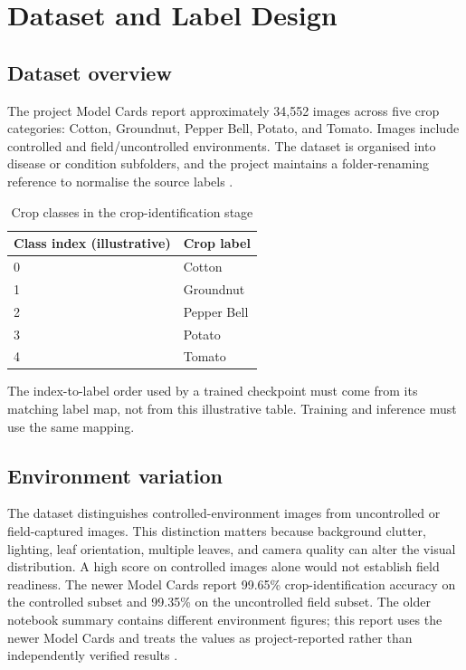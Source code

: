 \documentclass[12pt,a4paper,oneside,openany]{report}
\begin{document}
\chapter{Dataset and Label Design}
\section{Dataset overview}
The project Model Cards report approximately 34,552 images across five crop categories: Cotton, Groundnut, Pepper Bell, Potato, and Tomato. Images include controlled and field/uncontrolled environments. The dataset is organised into disease or condition subfolders, and the project maintains a folder-renaming reference to normalise the source labels \cite{dataset_doc,model_cards}.

\begin{table}[htbp]
\centering
\caption{Crop classes in the crop-identification stage}
\begin{tabularx}{\textwidth}{lX}
\toprule
\textbf{Class index (illustrative)} & \textbf{Crop label}\\
\midrule
0 & Cotton\\
1 & Groundnut\\
2 & Pepper Bell\\
3 & Potato\\
4 & Tomato\\
\bottomrule
\end{tabularx}
\end{table}
The index-to-label order used by a trained checkpoint must come from its matching label map, not from this illustrative table. Training and inference must use the same mapping.

\section{Environment variation}
The dataset distinguishes controlled-environment images from uncontrolled or field-captured images. This distinction matters because background clutter, lighting, leaf orientation, multiple leaves, and camera quality can alter the visual distribution. A high score on controlled images alone would not establish field readiness. The newer Model Cards report 99.65\% crop-identification accuracy on the controlled subset and 99.35\% on the uncontrolled field subset. The older notebook summary contains different environment figures; this report uses the newer Model Cards and treats the values as project-reported rather than independently verified results \cite{model_cards,dataset_doc}.
\end{document}
